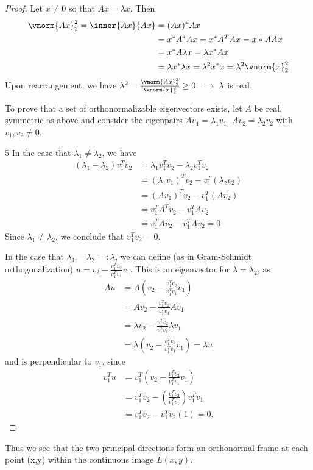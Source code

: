   \begin{proof}
     	Let $x\ne 0$ so that $Ax = \lambda x$. Then 
     	\begin{align*}
     	\vnorm{Ax}_2^2 = \inner{Ax}{Ax}  &= (Ax)^{*} Ax \\
     	&= x^{*}A^{*}Ax = x^{*}A^T A x = x*A A x \\
     	&= x^{*} A \lambda x = \lambda x^{*} A x \\
     	&= \lambda x^{*} \lambda x = \lambda^2 x^{*} x = \lambda ^2 \vnorm{x}_2^2
     	\end{align*}
     	Upon rearrangement, we have
     	$\lambda^2 = \frac{\vnorm{Ax}_2^2}{\vnorm{x}_2^2} \ge 0 \implies \lambda $ is real.
     	
     	To prove that a set of orthonormalizable eigenvectors exists,
     	let $A$ be real, symmetric as above and consider the eigenpairs
     	$Av_1 = \lambda_1 v_1$, $Av_2 = \lambda_2 v_2$ with $v_1, v_2 \ne 0$.

     	5
     	In the case that $\lambda_1 \ne \lambda_2$, we have
     	\begin{align*}
     	(\lambda_1 - \lambda_2)v_1^T v_2 &= \lambda_1 v_1^T v_2 - \lambda_2 v_1^T v_2 \\
     	&= (\lambda_1 v_1)^T v_2 - v_1^T (\lambda_2 v_2) \\
     	&= (Av_1)^T v_2 - v_1^T (Av_2) \\
     	&= v_1^T A^T v_2 - v_1^T A v_2 \\
     	&= v_1^T A v_2 - v_1^T A v_2 = 0
     	\end{align*}
     	Since $\lambda_1 \ne \lambda_2$, we conclude that $v_1^T v_2 = 0$.
     	
     	In the case that $\lambda_1 = \lambda_2 =: \lambda$, we can define
     	(as in Gram-Schmidt orthogonalization) $u = v_2 - \frac{v_1^Tv_2}{v_1^Tv_1}v_1$.
     	This is an eigenvector for $\lambda=\lambda_2$, as
     	\begin{align*}
     	Au &= A\left(v_2 - \frac{v_1^Tv_2}{v_1^Tv_1} v_1\right) \\
     	&= A v_2 - \frac{v_1^Tv_2}{v_1^Tv_1} A v_1 \\
     	&= \lambda v_2- \frac{v_1^Tv_2}{v_1^Tv_1} \lambda v_1 \\
     	&= \lambda \left( v_2 - \frac{v_1^Tv_2}{v_1^Tv_1} v_1 \right) = \lambda u
     	\end{align*}
     	and is perpendicular to $v_1$, since
     	\begin{align*}
     	v_1^T u &= v_1^T\left(v_2 - \frac{v_1^Tv_2}{v_1^Tv_1}v_1\right) \\
     	&= v_1^T v_2 - \left(\frac{v_1^Tv_2}{v_1^Tv_1}\right) v_1^T v_1 \\
     	&= v_1^T v_2 - v_1^Tv_2 (1) = 0.
     	\end{align*}
  \end{proof}
  
  Thus we see that the two principal directions form an orthonormal frame at each point (x,y) within the continuous image $L(x,y)$.
  






    
   
    
   
 
 
